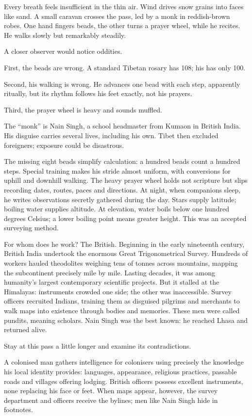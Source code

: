Every breath feels insufficient in the thin air. Wind drives snow grains into faces like sand. A small caravan crosses the pass, led by a monk in reddish-brown robes. One hand fingers beads, the other turns a prayer wheel, while he recites. He walks slowly but remarkably steadily.

A closer observer would notice oddities.

First, the beads are wrong. A standard Tibetan rosary has 108; his has only 100.

Second, his walking is wrong. He advances one bead with each step, apparently ritually, but its rhythm follows his feet exactly, not his prayers.

Third, the prayer wheel is heavy and sounds muffled.

The ``monk'' is Nain Singh, a school headmaster from Kumaon in British India. His disguise carries several lives, including his own. Tibet then excluded foreigners; exposure could be disastrous.

The missing eight beads simplify calculation: a hundred beads count a hundred steps. Special training makes his stride almost uniform, with conversions for uphill and downhill walking. The heavy prayer wheel holds not scripture but slips recording dates, routes, paces and directions. At night, when companions sleep, he writes observations secretly gathered during the day. Stars supply latitude; boiling water supplies altitude. At elevation, water boils below one hundred degrees Celsius; a lower boiling point means greater height. This was an accepted surveying method.

For whom does he work? The British. Beginning in the early nineteenth century, British India undertook the enormous Great Trigonometrical Survey. Hundreds of workers hauled theodolites weighing tens of tonnes across mountains, mapping the subcontinent precisely mile by mile. Lasting decades, it was among humanity's largest contemporary scientific projects. But it stalled at the Himalayas: instruments crowded one side; the other was inaccessible. Survey officers recruited Indians, training them as disguised pilgrims and merchants to walk maps into existence through bodies and memories. These men were called pundits, meaning scholars. Nain Singh was the best known: he reached Lhasa and returned alive.

Stay at this pass a little longer and examine its contradictions.

A colonised man gathers intelligence for colonisers using precisely the knowledge his local identity provides: languages, appearance, religious practices, passable roads and villages offering lodging. British officers possess excellent instruments, none replacing his face or feet. When maps appear, however, the survey department and officers receive the bylines; men like Nain Singh hide in footnotes.

